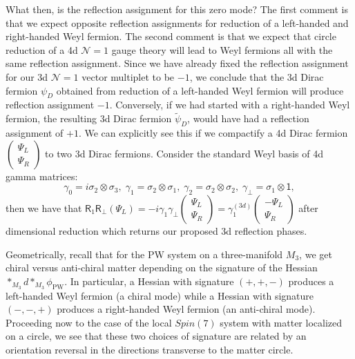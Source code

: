 \documentclass[12pt]{article}%
\numberwithin{equation}{section}
\renewcommand{\(}{\left(}
\renewcommand{\)}{\right)}
\renewcommand{\[}{\left[}
\renewcommand{\]}{\right]}
\begin{document}
What then, is the reflection assignment for this zero mode? The first comment is that we expect opposite reflection assignments for reduction of a left-handed and right-handed Weyl fermion. The second comment is that we expect that circle reduction of a
4d $\mathcal{N} = 1$ gauge theory will lead to Weyl fermions all with the same reflection assignment. Since we have already fixed the reflection assignment for our 3d $\mathcal{N} = 1$ vector multiplet to be $-1$, we conclude that the 3d Dirac fermion $\psi_D$ obtained from reduction of a left-handed Weyl fermion will produce reflection assignment $-1$. Conversely, if we had started with a right-handed Weyl fermion,
the resulting 3d Dirac fermion $\widetilde{\psi}_D$, would have had a reflection assignment of $+1$. We can explicitly see this if we compactify a 4d Dirac fermion $\begin{pmatrix}
           \Psi_L \\
           \Psi_R
        \end{pmatrix}$ to two 3d Dirac fermions. Consider the standard Weyl basis of 4d gamma matrices:
\begin{equation}
\gamma_0=i\sigma_2\otimes \sigma_3, \; \gamma_1=\sigma_2\otimes \sigma_1, \; \gamma_2=\sigma_2\otimes \sigma_2, \; \gamma_\perp=\sigma_1\otimes \mathsf{1},
\end{equation}
then we have that $\mathsf{R}_1\mathsf{R}_\perp(\Psi_L)=-i
\gamma_1\gamma_\perp \begin{pmatrix}
           \Psi_L \\
           \Psi_R
        \end{pmatrix}=\gamma^{(3d)}_1 \begin{pmatrix}
           -\Psi_L \\
           \Psi_R
        \end{pmatrix}$ after dimensional reduction which returns our proposed 3d reflection phases.




Geometrically, recall that for the PW system on a three-manifold $M_3$, we get chiral versus anti-chiral matter depending on the signature of the Hessian $\ast_{M_3} d \ast_{M_3} \phi_{\mathrm{PW}}$. In particular, a Hessian with signature $(+,+,-)$ produces a left-handed Weyl fermion (a chiral mode) while a Hessian with signature $(-,-,+)$ produces a right-handed Weyl fermion (an anti-chiral mode). Proceeding now to the case of the local $Spin(7)$ system with matter localized on a circle, we see that these two choices of signature are related by an orientation reversal in the directions transverse to the matter circle.
\end{document}

